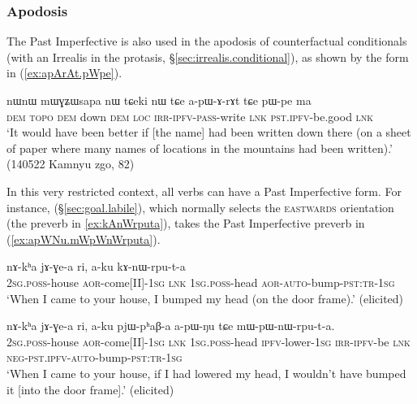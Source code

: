 \subsubsection{Apodosis} \label{sec:pst.ifr.ipfv.apodosis}
The Past Imperfective is also used in the apodosis of counterfactual conditionals (with an Irrealis in the protasis, §\ref{sec:irrealis.conditional}), as shown by the form  in (\ref{ex:apArAt.pWpe}).

\begin{exe}
\ex \label{ex:apArAt.pWpe}
\gll nɯnɯ mɯɣʑɯsapa nɯ tɕeki nɯ tɕe a-pɯ-ɤ-rɤt tɕe pɯ-pe ma \\ 
\textsc{dem}  \textsc{topo} \textsc{dem} down \textsc{dem} \textsc{loc} \textsc{irr}-\textsc{ipfv}-\textsc{pass}-write \textsc{lnk} \textsc{pst}.\textsc{ipfv}-be.good \textsc{lnk} \\
\glt `It would have been better if [the name]  had been written down there (on a sheet of paper where many names of locations in the mountains had been written).' (140522  Kamnyu zgo, 82)
\end{exe}

In this very restricted context, all verbs can have a Past Imperfective form. For instance,  (§\ref{sec:goal.labile}), which normally selects the \textsc{eastwards} orientation (the preverb  in \ref{ex:kAnWrputa}), takes the  Past Imperfective preverb in (\ref{ex:apWNu.mWpWnWrputa}).

\begin{exe}
\ex \label{ex:kAnWrputa}
\gll nɤ-kʰa jɤ-ɣe-a ri, a-ku kɤ-nɯ-rpu-t-a \\
\textsc{2sg}.\textsc{poss}-house \textsc{aor}-come[II]-\textsc{1sg} \textsc{lnk} \textsc{1sg}.\textsc{poss}-head \textsc{aor}-\textsc{auto}-bump-\textsc{pst}:\textsc{tr}-\textsc{1sg} \\
\glt `When I came to your house, I bumped my head (on the door frame).' (elicited)
\end{exe}

\begin{exe}
\ex \label{ex:apWNu.mWpWnWrputa}
\gll nɤ-kʰa jɤ-ɣe-a ri, a-ku pjɯ-pʰaβ-a a-pɯ-ŋu tɕe mɯ-pɯ-nɯ-rpu-t-a. \\
\textsc{2sg}.\textsc{poss}-house \textsc{aor}-come[II]-\textsc{1sg} \textsc{lnk} \textsc{1sg}.\textsc{poss}-head \textsc{ipfv}-lower-\textsc{1sg} \textsc{irr}-\textsc{ipfv}-be \textsc{lnk} \textsc{neg}-\textsc{pst}.\textsc{ipfv}-\textsc{auto}-bump-\textsc{pst}:\textsc{tr}-\textsc{1sg} \\
\glt `When I came to your house, if I had lowered my head, I wouldn't have bumped it [into the door frame].' (elicited)
\end{exe}

